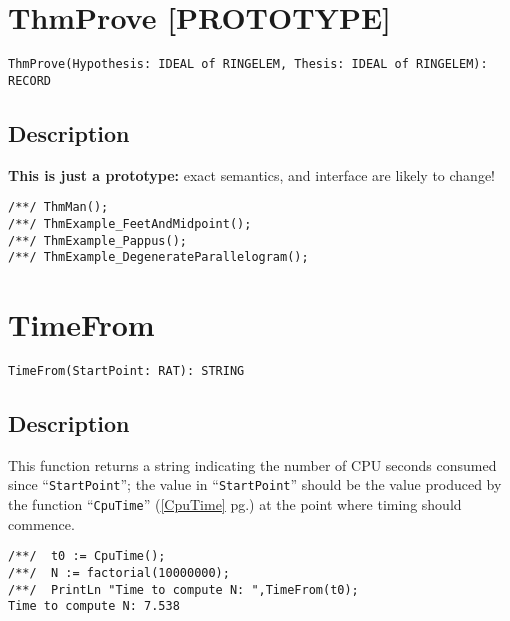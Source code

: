 \documentclass[a4paper]{mybook}
\newenvironment{command}{}{} %
\begin{document}
\section{ThmProve [PROTOTYPE]}
\label{ThmProve [PROTOTYPE]}
\begin{command} %


\begin{Verbatim}[label=syntax, rulecolor=\color{MidnightBlue},
frame=single]
ThmProve(Hypothesis: IDEAL of RINGELEM, Thesis: IDEAL of RINGELEM): RECORD
\end{Verbatim}


\subsection*{Description}

\textbf{This is just a prototype:} exact semantics, and interface are likely to change!
\begin{Verbatim}[label=example, rulecolor=\color{PineGreen}, frame=single]
/**/ ThmMan();
/**/ ThmExample_FeetAndMidpoint();
/**/ ThmExample_Pappus();
/**/ ThmExample_DegenerateParallelogram();
\end{Verbatim}


\end{command} %

\section{TimeFrom}
\label{TimeFrom}
\begin{command} %


\begin{Verbatim}[label=syntax, rulecolor=\color{MidnightBlue},
frame=single]
TimeFrom(StartPoint: RAT): STRING
\end{Verbatim}


\subsection*{Description}

This function returns a string indicating the number of CPU seconds consumed
since ``\verb&StartPoint&''; the value in ``\verb&StartPoint&'' should be the value produced
by the function ``\verb&CpuTime&'' (\ref{CpuTime} pg.\pageref{CpuTime}) at the point where timing should commence.
\begin{Verbatim}[label=example, rulecolor=\color{PineGreen}, frame=single]
/**/  t0 := CpuTime();
/**/  N := factorial(10000000);
/**/  PrintLn "Time to compute N: ",TimeFrom(t0);
Time to compute N: 7.538
\end{Verbatim}


\end{command} %
\end{document}

